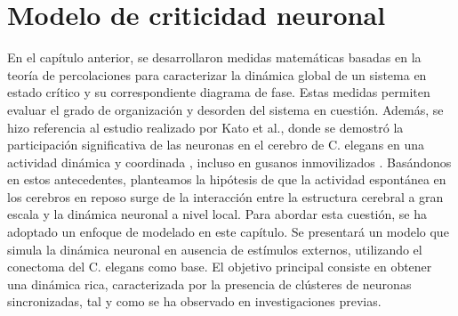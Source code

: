 \chapter{Modelo de criticidad neuronal}\label{titulo-modelo-criticidad}
\graphicspath{{figs/capitulo_modelo_criticidad/}}




En el capítulo anterior, se desarrollaron medidas matemáticas basadas en la teoría de percolaciones para caracterizar la dinámica global de un sistema en estado crítico y su correspondiente diagrama de fase. Estas medidas permiten evaluar el grado de organización y desorden del sistema en cuestión. Además, se hizo referencia al estudio realizado por Kato et al., donde se demostró la participación significativa de las neuronas en el cerebro de C. elegans en una actividad dinámica y coordinada , incluso en gusanos inmovilizados \cite{kato_global_2015}. Basándonos en estos antecedentes, planteamos la hipótesis de que la actividad espontánea en los cerebros en reposo surge de la interacción entre la estructura cerebral a gran escala y la dinámica neuronal a nivel local. Para abordar esta cuestión, se ha adoptado un enfoque de modelado en este capítulo. Se presentará un modelo que simula la dinámica neuronal en ausencia de estímulos externos, utilizando el conectoma del C. elegans como base. El objetivo principal consiste en obtener una dinámica rica, caracterizada por la presencia de clústeres de neuronas sincronizadas, tal y como se ha observado en investigaciones previas.



